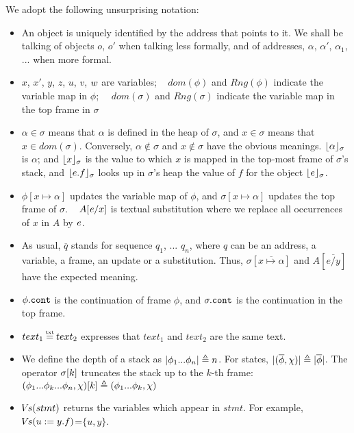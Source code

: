  
 
 We adopt the following unsurprising notation:
\label{s:notation}
\begin{itemize}
\item
{An object is uniquely identified by the address that points to it. We shall be talking of objects $o$, $o'$ when talking less formally, and of addresses, $\alpha$, $\alpha'$, $\alpha_1$, ...  when more formal.}
\item
$x$, $x'$, $y$, $z$, $u$, $v$, $w$  are {variables}; \ 
$dom(\phi)$ and $Rng(\phi)$ indicate the variable map in $\phi$; \ \ $dom(\sigma)$ and $Rng(\sigma)$ indicate the variable map in the top frame in $\sigma$
\item
$\alpha \in \sigma$ means that $\alpha$ is defined in the heap of $\sigma$, and $x\in \sigma$ means that $x\in dom(\sigma)$.
Conversely,  $\alpha\notin\sigma$ and $x\notin\sigma$ %
 have the obvious meanings.
$\lfloor \alpha \rfloor_{\sigma}$  is $\alpha$; and $\lfloor x \rfloor_{\sigma}$  is the value to which  $x$  is mapped in the top-most frame of $\sigma$'s stack, 
and $\lfloor e.f \rfloor_{\sigma}$ looks up in $\sigma$'s heap the value of $f$ for the object  $\lfloor e \rfloor_{\sigma}$.
\item %
$\phi[x \mapsto \alpha]$ updates  the variable map  of $\phi$,  
and  $\sigma[x \mapsto \alpha]$ updates the top frame of $\sigma$. \
$A[\mathit{e}/x]$ is textual substitution where we replace all occurrences of $x$ in $A$ by $\mathit{e}$. 
\item
As usual, $\overline q$ stands for  sequence $q_1$, ... $q_n$, where $q$ can be an address, a variable,    a frame, an update or a substitution.
Thus,   $\sigma[\overline{x \mapsto \alpha}]$ and $A[ \overline{e/y}]$ 
have the expected meaning.
\item
$\phi.\mbox{\normalfont{\texttt{cont}}}$ is the continuation of frame $\phi$, and  $\sigma.\mbox{\normalfont{\texttt{cont}}}$ is the continuation in the top frame.
\item
$text_1 \txteq text_2$ expresses that $text_1$ and $text_2$ are  the same text.%
\item
We define the depth of a stack as $|\phi_1...\phi_n| \triangleq n$. For states, $|(\overline \phi, \chi)| \triangleq  |\overline \phi|$.
The  operator $\sigma[k]$ truncates the stack up to the $k$-th frame: %
 $(\phi_1...\phi_k...\phi_n,\chi)[k]  \triangleq   (\phi_1...\phi_k,\chi)$
\item
{ ${\hspace{-1pt}V\hspace{-1pt}}s(stmt)$ returns the variables which appear in $stmt$. For example, ${\hspace{-1pt}V\hspace{-1pt}}s(u:=y.f)$=$\{u,y\}$.}
\end{itemize}

